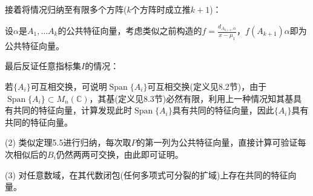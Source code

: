 \documentclass[a4paper,UTF8,fontset=windows]{ctexart}
\DeclareMathOperator{\Span}{Span}
\begin{document}
\begin{enumerate}
接着将情况归纳至有限多个方阵($k$个方阵时成立推$k+1$)：

设$\alpha$是$A_1,\dots A_k$的公共特征向量，考虑类似之前构造的$f=\frac{d_{A_{k+1},\alpha}}{x-\mu_1}$，$f(A_{k+1})\alpha$即为公共特征向量。

最后反证任意指标集$I$的情况：

若$\{A_i\}$可互相交换，可说明$\Span\{A_i\}$可互相交换(定义见8.2节)，由于$\Span\{A_i\}\subset M_n(\mathbb{C})$，其基(定义见8.3节)必然有限，利用上一种情况知其基具有共同的特征向量，计算发现此时$\Span\{A_i\}$具有共同的特征向量，因此$\{A_i\}$具有共同的特征向量。

(2) 类似定理5.5进行归纳，每次取$P$的第一列为公共特征向量，直接计算可验证每次相似后的$B_i$仍然两两可交换，由此即可证明。

(3) 对任意数域，在其代数闭包(任何多项式可分裂的扩域)上存在共同的特征向量。
\end{enumerate}
\end{document}
